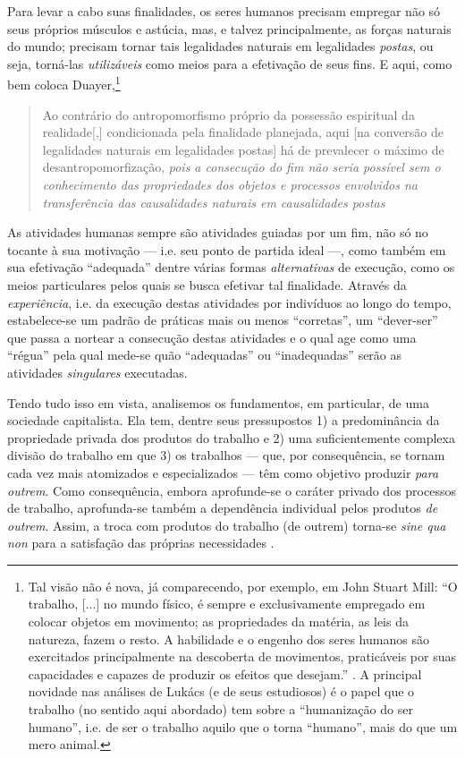 \documentclass[12pt]{article}
\numberwithin{equation}{section}
\theoremstyle{plain}
\theoremstyle{definition}
\theoremstyle{remark}
\begin{document}
Para levar a cabo suas finalidades, os seres humanos precisam empregar não só seus próprios músculos e astúcia, mas, e talvez principalmente, as forças naturais do mundo; precisam tornar tais legalidades naturais em legalidades \textit{postas}, ou seja, torná-las \textit{utilizáveis} como meios para a efetivação de seus fins. E aqui, como bem coloca Duayer,\footnote{Tal visão não é nova, já comparecendo, por exemplo, em John Stuart Mill: ``O trabalho, [...] no mundo físico, é sempre e exclusivamente empregado em colocar objetos em movimento; as propriedades da matéria, as leis da natureza, fazem o resto. A habilidade e o engenho dos seres humanos são exercitados principalmente na descoberta de movimentos, praticáveis por suas capacidades e capazes de produzir os efeitos que desejam.'' \parencite[p. 48]{Mill1909}. A principal novidade nas análises de Lukács (e de seus estudiosos) é o papel que o trabalho (no sentido aqui abordado) tem sobre a ``humanização do ser humano'', i.e. de ser o trabalho aquilo que o torna ``humano'', mais do que um mero animal.}
\begin{quote}
    Ao contrário do antropomorfismo próprio da possessão espiritual da realidade[,] condicionada pela finalidade planejada, aqui [na conversão de legalidades naturais em legalidades postas] há de prevalecer o máximo de desantropomorfização, \textit{pois a consecução do fim não seria possível sem o conhecimento das propriedades dos objetos e processos envolvidos na transferência das causalidades naturais em causalidades postas} \parencite[p. 127, grifo meu]{Duayer2023a}
\end{quote}

As atividades humanas sempre são atividades guiadas por um fim, não só no tocante à sua motivação --- i.e. seu ponto de partida ideal ---, como também em sua efetivação ``adequada'' dentre várias formas \textit{alternativas} de execução, como os meios particulares pelos quais se busca efetivar tal finalidade. Através da \textit{experiência}, i.e. da execução destas atividades por indivíduos ao longo do tempo, estabelece-se um padrão de práticas mais ou menos ``corretas'', um ``dever-ser'' que passa a nortear a consecução destas atividades e o qual age como uma ``régua'' pela qual mede-se quão ``adequadas'' ou ``inadequadas'' serão as atividades \textit{singulares} executadas. 

Tendo tudo isso em vista, analisemos os fundamentos, em particular, de uma sociedade capitalista. Ela tem, dentre seus pressupostos 1) a predominância da propriedade privada dos produtos do trabalho e 2) uma suficientemente complexa divisão do trabalho em que 3) os trabalhos --- que, por consequência, se tornam cada vez mais atomizados e especializados --- têm como objetivo produzir \textit{para outrem}. Como consequência, embora aprofunde-se o caráter privado dos processos de trabalho, aprofunda-se também a dependência individual pelos produtos \textit{de outrem}. Assim, a troca com produtos do trabalho (de outrem) torna-se \textit{sine qua non} para a satisfação das próprias necessidades \parencite[pp. 328-330]{Medeiros2013a}.
\end{document}

